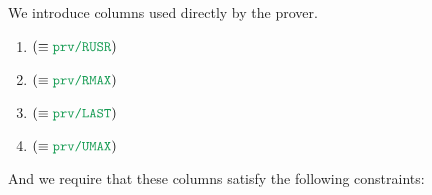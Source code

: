 \def\proverColA {\loc{prv\separator{}UMAX}}
\def\proverColB {\loc{prv\separator{}RUSR}}
\def\proverColC {\loc{prv\separator{}RMAX}}
\def\proverColD {\loc{prv\separator{}LAST}}
We introduce columns used directly by the prover.
\begin{enumerate}
        \item \proverColumnRelativeUserTransactionNumber    {} $(\equiv \proverColB)$
        \item \proverColumnRelativeUserTransactionNumberMax {} $(\equiv \proverColC)$ 
        \item \proverColumnIsLastUserTransactionOfBlock     {} $(\equiv \proverColD)$ 
        \item \proverColumnUserTransactionNumberMax         {} $(\equiv \proverColA)$
\end{enumerate}
And we require that these columns satisfy the following constraints:
